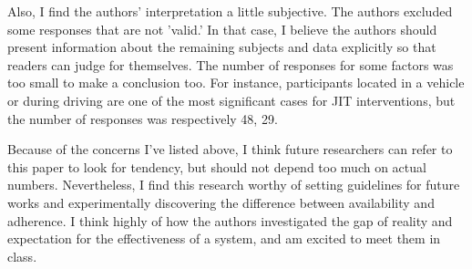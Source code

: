 \documentclass[10pt,a4paper]{article}
\begin{document}
	Also, I find the authors' interpretation a little subjective. The authors excluded some responses that are not 'valid.' In that case, I believe the authors should present information about the remaining subjects and data explicitly so that readers can judge for themselves. The number of responses for some factors was too small to make a conclusion too. For instance, participants located in a vehicle or during driving are one of the most significant cases for JIT interventions, but the number of responses was respectively 48, 29.
	
	Because of the concerns I've listed above, I think future researchers can refer to this paper to look for tendency, but should not depend too much on actual numbers. Nevertheless, I find this research worthy of setting guidelines for future works and experimentally discovering the difference between availability and adherence. I think highly of how the authors investigated the gap of reality and expectation for the effectiveness of a system, and am excited to meet them in class.
	
	
\end{document}
